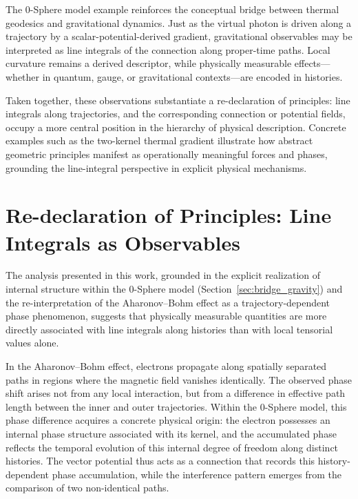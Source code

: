 \documentclass[%
 reprint,
 amsmath,amssymb,
 aps,
 prb,
]{revtex4-2}
\numberwithin{equation}{section}
\begin{document}
The 0-Sphere model example reinforces the conceptual bridge between thermal geodesics and gravitational dynamics. Just as the virtual photon is driven along a trajectory by a scalar-potential-derived gradient, gravitational observables may be interpreted as line integrals of the connection along proper-time paths. Local curvature remains a derived descriptor, while physically measurable effects—whether in quantum, gauge, or gravitational contexts—are encoded in histories.

Taken together, these observations substantiate a re-declaration of principles: line integrals along trajectories, and the corresponding connection or potential fields, occupy a more central position in the hierarchy of physical description. Concrete examples such as the two-kernel thermal gradient illustrate how abstract geometric principles manifest as operationally meaningful forces and phases, grounding the line-integral perspective in explicit physical mechanisms.

\section{Re-declaration of Principles: Line Integrals as Observables}
\label{sec:redeclaration_line_integrals}

The analysis presented in this work, grounded in the explicit realization of internal structure within the 0-Sphere model (Section~\ref{sec:bridge_gravity}) and the re-interpretation of the Aharonov--Bohm effect as a trajectory-dependent phase phenomenon, suggests that physically measurable quantities are more directly associated with line integrals along histories than with local tensorial values alone.

In the Aharonov--Bohm effect, electrons propagate along spatially separated paths in regions where the magnetic field vanishes identically. The observed phase shift arises not from any local interaction, but from a difference in effective path length between the inner and outer trajectories. Within the 0-Sphere model, this phase difference acquires a concrete physical origin: the electron possesses an internal phase structure associated with its kernel, and the accumulated phase reflects the temporal evolution of this internal degree of freedom along distinct histories. The vector potential thus acts as a connection that records this history-dependent phase accumulation, while the interference pattern emerges from the comparison of two non-identical paths.
\end{document}
